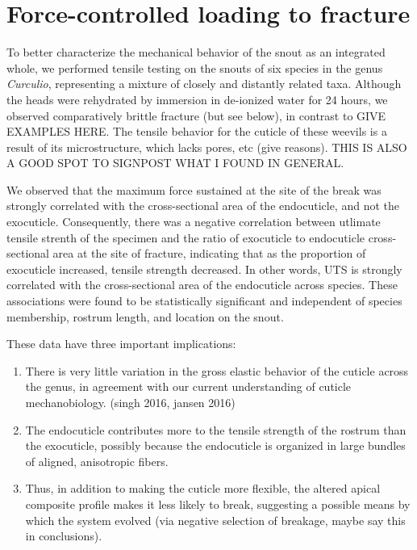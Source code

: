 \documentclass[twocolumn, linenumbers, superscriptaddress]{revtex4-1}
\begin{document}
	\section{Force-controlled loading to fracture}
		To better characterize the mechanical behavior of the snout as an integrated whole, we performed tensile testing on the snouts of six species in the genus \textit{Curculio}, representing a mixture of closely and distantly related taxa.
		Although the heads were rehydrated by immersion in de-ionized water for 24 hours, we observed comparatively brittle fracture (but see below), in contrast to GIVE EXAMPLES HERE.
		The tensile behavior for the cuticle of these weevils is a result of its microstructure, which lacks pores, etc (give reasons).
		THIS IS ALSO A GOOD SPOT TO SIGNPOST WHAT I FOUND IN GENERAL.
		
		We observed that the maximum force sustained at the site of the break was strongly correlated with the cross-sectional area of the endocuticle, and not the exocuticle.
		Consequently, there was a negative correlation between utlimate tensile strenth of the specimen and the ratio of exocuticle to endocuticle cross-sectional area at the site of fracture, indicating that as the proportion of exocuticle increased, tensile strength decreased.
		In other words, UTS is strongly correlated with the cross-sectional area of the endocuticle across species.
		These associations were found to be statistically significant and independent of species membership, rostrum length, and location on the snout.
		
		These data have three important implications:
		\begin{enumerate}
			\item There is very little variation in the gross elastic behavior of the cuticle across the genus, in agreement with our current understanding of cuticle mechanobiology. (singh 2016, jansen 2016)
			\item The endocuticle contributes more to the tensile strength of the rostrum than the exocuticle, possibly because the endocuticle is organized in large bundles of aligned, anisotropic fibers.
			\item Thus, in addition to making the cuticle more flexible, the altered apical composite profile makes it less likely to break, suggesting a possible means by which the system evolved (via negative selection of breakage, maybe say this in conclusions).
		\end{enumerate}
		
\end{document}
